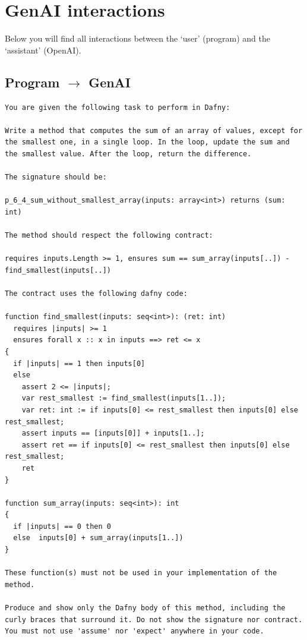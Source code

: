 \documentclass{article}
\begin{document}
\section*{GenAI interactions}
Below you will find all interactions between the `user' (program) and the `assistant' (OpenAI).
\subsection*{Program $\rightarrow$ GenAI}
\begin{lstlisting}
You are given the following task to perform in Dafny:

Write a method that computes the sum of an array of values, except for the smallest one, in a single loop. In the loop, update the sum and the smallest value. After the loop, return the difference.

The signature should be:

p_6_4_sum_without_smallest_array(inputs: array<int>) returns (sum: int)

The method should respect the following contract:

requires inputs.Length >= 1, ensures sum == sum_array(inputs[..]) - find_smallest(inputs[..])

The contract uses the following dafny code:

function find_smallest(inputs: seq<int>): (ret: int)
  requires |inputs| >= 1
  ensures forall x :: x in inputs ==> ret <= x 
{
  if |inputs| == 1 then inputs[0]
  else 
    assert 2 <= |inputs|;
    var rest_smallest := find_smallest(inputs[1..]);
    var ret: int := if inputs[0] <= rest_smallest then inputs[0] else rest_smallest;
    assert inputs == [inputs[0]] + inputs[1..]; 
    assert ret == if inputs[0] <= rest_smallest then inputs[0] else rest_smallest;
    ret 
}

function sum_array(inputs: seq<int>): int
{
  if |inputs| == 0 then 0
  else  inputs[0] + sum_array(inputs[1..])
}

These function(s) must not be used in your implementation of the method.

Produce and show only the Dafny body of this method, including the curly braces that surround it. Do not show the signature nor contract. You must not use 'assume' nor 'expect' anywhere in your code.
\end{lstlisting}
\end{document}
